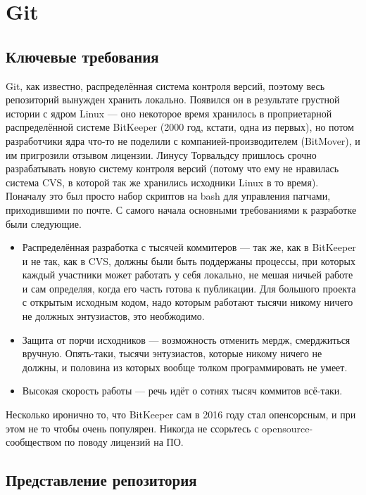 \documentclass[a5paper]{article}
\begin{document}
\section{Git}

\subsection{Ключевые требования}

Git, как известно, распределённая система контроля версий, поэтому весь репозиторий вынужден хранить локально. Появился он в результате грустной истории с ядром Linux --- оно некоторое время хранилось в проприетарной распределённой системе BitKeeper (2000 год, кстати, одна из первых), но потом разработчики ядра что-то не поделили с компанией-производителем (BitMover), и им пригрозили отзывом лицензии. Линусу Торвальдсу пришлось срочно разрабатывать новую систему контроля версий (потому что ему не нравилась система CVS, в которой так же хранились исходники Linux в то время). Поначалу это был просто набор скриптов на bash для управления патчами, приходившими по почте. С самого начала основными требованиями к разработке были следующие.

\begin{itemize}
	\item Распределённая разработка с тысячей коммитеров --- так же, как в BitKeeper и не так, как в CVS, должны были быть поддержаны процессы, при которых каждый участники может работать у себя локально, не мешая ничьей работе и сам определяя, когда его часть готова к публикации. Для большого проекта с открытым исходным кодом, надо которым работают тысячи никому ничего не должных энтузиастов, это необжодимо.
	\item Защита от порчи исходников --- возможность отменить мердж, смерджиться вручную. Опять-таки, тысячи энтузиастов, которые никому ничего не должны, и половина из которых вообще толком программировать не умеет.
	\item Высокая скорость работы --- речь идёт о сотнях тысяч коммитов всё-таки.
\end{itemize}

Несколько иронично то, что BitKeeper сам в 2016 году стал опенсорсным, и при этом не то чтобы очень популярен. Никогда не ссорьтесь с opensource-сообществом по поводу лицензий на ПО.

\subsection{Представление репозитория}
\end{document}
